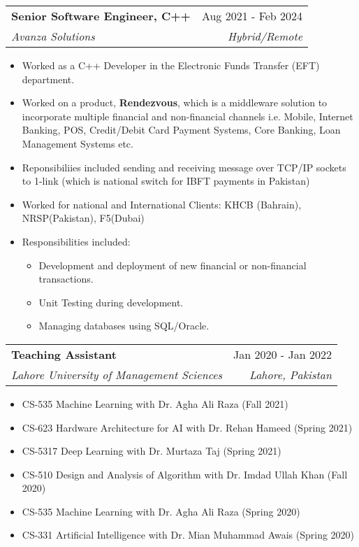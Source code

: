 \documentclass[letterpaper,11pt]{article}
\makeatletter
\newcommand{\resumeItem}[1]{
  \item\small{
    {#1 \vspace{-2pt}}
  }
}
\newcommand{\resumeSubheading}[4]{
  \vspace{-2pt}\item
    \begin{tabular*}{0.97\textwidth}[t]{l@{\extracolsep{\fill}}r}
      \textbf{#1} & #2 \\
      \textit{\small#3} & \textit{\small #4} \\
    \end{tabular*}\vspace{-7pt}
}
\newcommand{\resumeItemListStart}{\begin{itemize}}
\newcommand{\resumeItemListEnd}{\end{itemize}\vspace{-5pt}}
\makeatother
\begin{document}
    \resumeSubheading
      {Senior Software Engineer, C++}{Aug 2021 - Feb 2024}
      {Avanza Solutions}{Hybrid/Remote}
      \resumeItemListStart
        \resumeItem{Worked as a C++ Developer in the Electronic Funds Transfer (EFT) department.}
        \resumeItem{Worked on a product, \textbf{Rendezvous}, which is a middleware solution to incorporate multiple financial and non-financial channels i.e. Mobile, Internet Banking, POS, Credit/Debit Card Payment Systems, Core Banking, Loan Management Systems etc.}
        \resumeItem{Reponsibiliies included sending and receiving message over TCP/IP sockets to 1-link (which is national switch for IBFT payments in Pakistan)}
        \resumeItem{Worked for national and International Clients: KHCB (Bahrain), NRSP(Pakistan), F5(Dubai)}
        \resumeItem{Responsibilities included:
            \resumeItemListStart
        			\resumeItem{Development and deployment of new financial or non-financial transactions.}
        			\resumeItem{Unit Testing during development.}
        			\resumeItem{Managing databases using SQL/Oracle.}
   			\resumeItemListEnd}
    \resumeItemListEnd
      
    \resumeSubheading
      {Teaching Assistant}{Jan 2020 - Jan 2022}
      {Lahore University of Management Sciences}{Lahore, Pakistan}
      \vspace{0.1cm}
      
      \resumeItemListStart
      During my 2 year of MS at LUMS, I worked as a TA for 5 graduate level courses and 1 undergraduate course. For these courses I designed and graded assignments/quizzes and also conducted tutorial sessions. The courses are:
        \resumeItem{CS-535 Machine Learning with Dr. Agha Ali Raza (Fall 2021)}
        \resumeItem{CS-623 Hardware Architecture for AI with Dr. Rehan Hameed (Spring 2021)}
        \resumeItem{CS-5317 Deep Learning with Dr. Murtaza Taj (Spring 2021)}
        \resumeItem{CS-510 Design and Analysis of Algorithm with Dr. Imdad Ullah Khan (Fall 2020)}
        \resumeItem{CS-535 Machine Learning with Dr. Agha Ali Raza (Spring 2020)}
        \resumeItem{CS-331 Artificial Intelligence with Dr. Mian Muhammad Awais (Spring 2020)}        
     \resumeItemListEnd      
      
      
\end{document}
